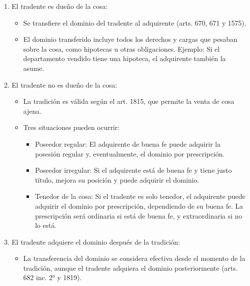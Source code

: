\documentclass{templateNote}
\begin{document}
\begin{enumerate}
    \item El tradente es dueño de la cosa:
    \begin{itemize}
        \item Se transfiere el dominio del tradente al adquirente (arts. 670, 671 y 1575).
        \item El dominio transferido incluye todos los derechos y cargas que pesaban sobre la cosa, como hipotecas u otras obligaciones. Ejemplo: Si el departamento vendido tiene una hipoteca, el adquirente también la asume.
    \end{itemize}
    \item El tradente no es dueño de la cosa:
    \begin{itemize}
        \item La tradición es válida según el art. 1815, que permite la venta de cosa ajena.
        \item Tres situaciones pueden ocurrir:
        \begin{itemize}
            \item Poseedor regular: El adquirente de buena fe puede adquirir la posesión regular y, eventualmente, el dominio por prescripción.
            \item Poseedor irregular: Si el adquirente está de buena fe y tiene justo título, mejora su posición y puede adquirir el dominio.
            \item Tenedor de la cosa: Si el tradente es solo tenedor, el adquirente puede adquirir el dominio por prescripción, dependiendo de su buena fe. La prescripción será ordinaria si está de buena fe, y extraordinaria si no lo está.
        \end{itemize}
    \end{itemize}
    \item El tradente adquiere el dominio después de la tradición:
    \begin{itemize}
        \item La transferencia del dominio se considera efectiva desde el momento de la tradición, aunque el tradente adquiera el dominio posteriormente (arts. 682 inc. 2° y 1819).
    \end{itemize}
\end{enumerate}
\end{document}
